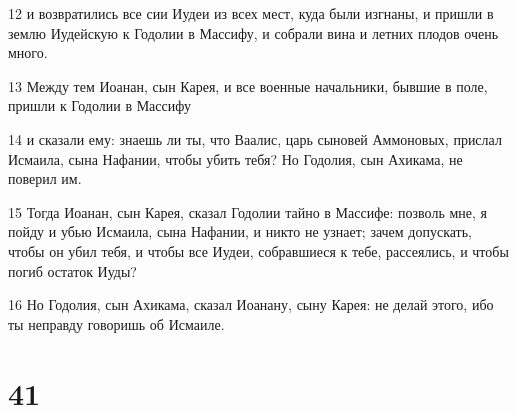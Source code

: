 \par 12 и возвратились все сии Иудеи из всех мест, куда были изгнаны, и пришли в землю Иудейскую к Годолии в Массифу, и собрали вина и летних плодов очень много.
\par 13 Между тем Иоанан, сын Карея, и все военные начальники, бывшие в поле, пришли к Годолии в Массифу
\par 14 и сказали ему: знаешь ли ты, что Ваалис, царь сыновей Аммоновых, прислал Исмаила, сына Нафании, чтобы убить тебя? Но Годолия, сын Ахикама, не поверил им.
\par 15 Тогда Иоанан, сын Карея, сказал Годолии тайно в Массифе: позволь мне, я пойду и убью Исмаила, сына Нафании, и никто не узнает; зачем допускать, чтобы он убил тебя, и чтобы все Иудеи, собравшиеся к тебе, рассеялись, и чтобы погиб остаток Иуды?
\par 16 Но Годолия, сын Ахикама, сказал Иоанану, сыну Карея: не делай этого, ибо ты неправду говоришь об Исмаиле.

\chapter{41}

